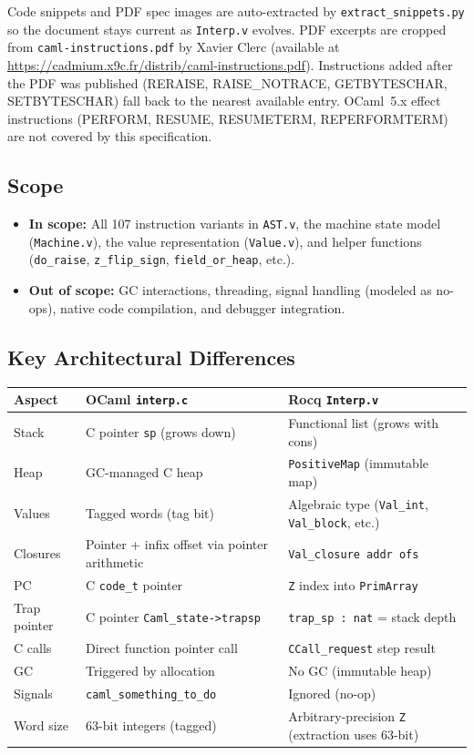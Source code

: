 \documentclass[11pt,a4paper]{article}
\begin{document}
Code snippets and PDF spec images are auto-extracted by
\texttt{extract\_snippets.py} so the document stays current as
\texttt{Interp.v} evolves.  PDF excerpts are cropped from
\texttt{caml-instructions.pdf} by Xavier Clerc (available at
\url{https://cadmium.x9c.fr/distrib/caml-instructions.pdf}).
Instructions added after the PDF was published (RERAISE, RAISE\_NOTRACE,
GETBYTESCHAR, SETBYTESCHAR) fall back to the nearest available entry.
OCaml~5.x effect instructions (PERFORM, RESUME, RESUMETERM,
REPERFORMTERM) are not covered by this specification.

\subsection{Scope}

\begin{itemize}
  \item \textbf{In scope:} All 107 instruction variants in \texttt{AST.v},
    the machine state model (\texttt{Machine.v}), the value representation
    (\texttt{Value.v}), and helper functions (\texttt{do\_raise},
    \texttt{z\_flip\_sign}, \texttt{field\_or\_heap}, etc.).
  \item \textbf{Out of scope:} GC interactions, threading, signal handling
    (modeled as no-ops), native code compilation, and debugger integration.
\end{itemize}

\subsection{Key Architectural Differences}

\begin{longtable}{p{3.5cm}p{5.5cm}p{5.5cm}}
\toprule
\textbf{Aspect} & \textbf{OCaml \texttt{interp.c}} & \textbf{Rocq \texttt{Interp.v}} \\
\midrule
\endhead
Stack & C pointer \texttt{sp} (grows down) & Functional list (grows with cons) \\
Heap & GC-managed C heap & \texttt{PositiveMap} (immutable map) \\
Values & Tagged words (tag bit) & Algebraic type (\texttt{Val\_int}, \texttt{Val\_block}, etc.) \\
Closures & Pointer + infix offset via pointer arithmetic & \texttt{Val\_closure addr ofs} \\
PC & C \texttt{code\_t} pointer & \texttt{Z} index into \texttt{PrimArray} \\
Trap pointer & C pointer \texttt{Caml\_state->trapsp} & \texttt{trap\_sp : nat} = stack depth \\
C calls & Direct function pointer call & \texttt{CCall\_request} step result \\
GC & Triggered by allocation & No GC (immutable heap) \\
Signals & \texttt{caml\_something\_to\_do} & Ignored (no-op) \\
Word size & 63-bit integers (tagged) & Arbitrary-precision \texttt{Z} (extraction uses 63-bit) \\
\bottomrule
\end{longtable}
\end{document}
